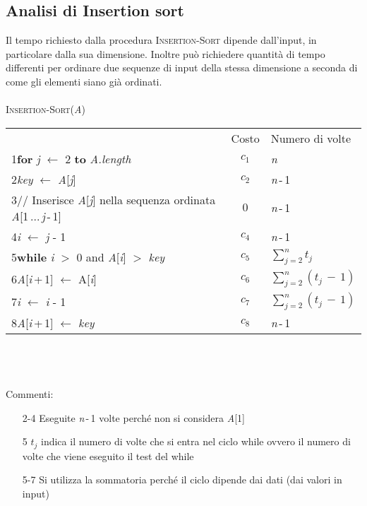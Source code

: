 \documentclass[10pt, a4paper]{report}
\newcommand\firsttab[1][0.5cm]{\hspace*{#1}}
\newcommand\secondtab[1][1cm]{\hspace*{#1}}
\newcommand\thirdtab[1][1.5cm]{\hspace*{#1}}
\begin{document}
\subsection{Analisi di Insertion sort}
Il tempo richiesto dalla procedura \textsc{Insertion-Sort} dipende dall'input, in particolare dalla sua dimensione. Inoltre può richiedere quantità di tempo differenti per ordinare due sequenze di input della stessa dimensione a seconda di come gli elementi siano già ordinati.\\\\
\textsc{Insertion-Sort(\textit{A})}\\
\begin{tabular}{lcl}
\em  & Costo & Numero di volte \\
1\firsttab \textbf{for} \textit{j}  $\leftarrow$ 2 \textbf{to} \textit{A.length} & $c_1$ & \textit{n} \\
2\secondtab \textit{key} $\leftarrow$ \textit{A}[\textit{j}] &$c_2$ &\textit{n}\,-\,1 \\
3\secondtab// Inserisce \textit{A}[\textit{j}] nella sequenza ordinata \textit{A}[1\,...\,\textit{j}\,-\,1] &$0$ &\textit{n}\,-\,1\\
4\secondtab \textit{i}  $\leftarrow$ \textit{j}  - 1 &$c_4$ &\textit{n}\,-\,1\\
5\secondtab \textbf{while} \textit{i}  $>$ 0 and \textit{A}[\textit{i}] $>$ \textit{key} &$c_5$ &$\sum_{j=2}^{n} t_j$\\
6\thirdtab \textit{A}[\textit{i}\,+\,1] $\leftarrow$ A[\textit{i}] &$c_6$ &$\sum_{j=2}^{n} (t_j\,-\,1)$\\
7\thirdtab \textit{i}  $\leftarrow$ \textit{i}  - 1 &$c_7$ &$\sum_{j=2}^{n} (t_j\,-\,1)$\\
8\secondtab \textit{A}[\textit{i}\,+\,1] $\leftarrow$ \textit{key} &$c_8$ &\textit{n}\,-\,1
\end{tabular}
\\\\\\Commenti:
\begin{enumerate}
\item[2-4]Eseguite \textit{n}\,-\,1 volte perché non si considera \textit{A}[1]
\item[5]$t_j$ indica il numero di volte che si entra nel ciclo while ovvero il numero di volte che viene eseguito il test del while
\item[5-7]Si utilizza la sommatoria perché il ciclo dipende dai dati (dai valori in input)
\end{enumerate}
\end{document}
